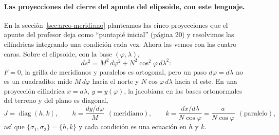 \paragraph{Las proyecciones del cierre del apunte del elipsoide, con este lenguaje.} En
la sección~\ref{sec:arco-meridiano} planteamos las cinco proyecciones que el apunte del
profesor deja como ``puntapié inicial'' (página 20) y resolvimos las cilíndricas
integrando una condición cada vez. Ahora las vemos con las cuatro caras. Sobre el
elipsoide, con la base \((\varphi,\lambda)\),
\[
  ds^2=M^2\,d\varphi^2+N^2\cos^2\varphi\,d\lambda^2 :
\]
\(F=0\), la grilla de meridianos y paralelos es ortogonal, pero un paso \(d\varphi=d\lambda\)
no es un cuadradito: mide \(M\,d\varphi\) hacia el norte y \(N\cos\varphi\,d\lambda\) hacia
el este. En una proyección cilíndrica \(x=a\lambda\), \(y=y(\varphi)\), la jacobiana en las
bases ortonormales del terreno y del plano es diagonal,
\[
  J=\operatorname{diag}(h,k),\qquad
  h=\frac{dy/d\varphi}{M}\ \ (\text{meridiano}),\qquad
  k=\frac{dx/d\lambda}{N\cos\varphi}=\frac{a}{N\cos\varphi}\ \ (\text{paralelo}),
\]
así que \(\{\sigma_1,\sigma_2\}=\{h,k\}\) y cada condición es una ecuación en \(h\) y \(k\).
